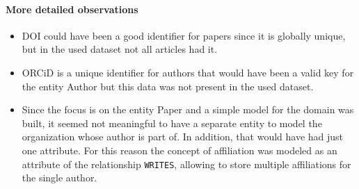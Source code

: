 \paragraph{More detailed observations}
\begin{itemize}
    \item DOI could have been a good identifier for papers since it is globally unique, but in the used dataset not all articles had it.
    \item ORCiD is a unique identifier for authors that would have been a valid key for the entity Author but this data was not present in the used dataset.
    \item Since the focus is on the entity Paper and a simple model for the domain was built, it seemed not meaningful to have a separate entity to model the organization whose author is part of.
    In addition, that would have had just one attribute.
    For this reason the concept of affiliation was modeled as an attribute of the relationship \verb|WRITES|, allowing to store multiple affiliations for the single author.
\end{itemize}
